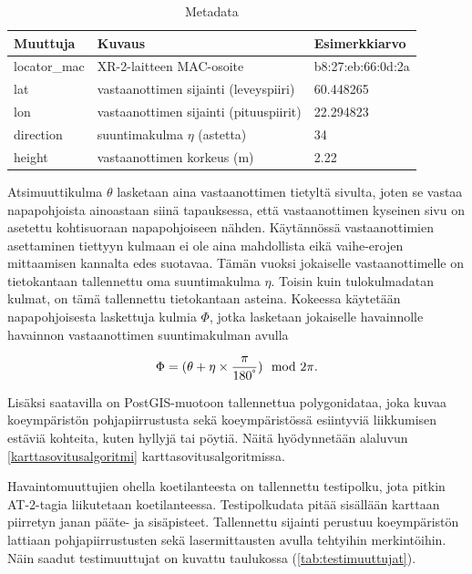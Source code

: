 \documentclass[
  12pt,
  a4paper, twoside]{book}
\begin{document}
\def\arraystretch{1.25} 
\begin{table}[H]
\centering
\begin{tabular}{|l|l|l|}
\hline
Muuttuja & Kuvaus & Esimerkkiarvo\\
\hline
locator\_mac & XR-2-laitteen MAC-osoite & b8:27:eb:66:0d:2a\\
lat & vastaanottimen sijainti (leveyspiiri) & 60.448265\\
lon & vastaanottimen sijainti (pituuspiirit) & 22.294823\\
direction & suuntimakulma $\eta$ (astetta) & 34\\
height & vastaanottimen korkeus (m) & 2.22 \\
\hline
\end{tabular}
\caption{Metadata}
\label{tab:metadata}
\end{table}

Atsimuuttikulma \(\theta\) lasketaan aina vastaanottimen tietyltä sivulta, joten se vastaa napapohjoista ainoastaan siinä tapauksessa, että vastaanottimen kyseinen sivu on asetettu kohtisuoraan napapohjoiseen nähden. Käytännössä vastaanottimien asettaminen tiettyyn kulmaan ei ole aina mahdollista eikä vaihe-erojen mittaamisen kannalta edes suotavaa. Tämän vuoksi jokaiselle vastaanottimelle on tietokantaan tallennettu oma suuntimakulma \(\eta\). Toisin kuin tulokulmadatan kulmat, on tämä tallennettu tietokantaan asteina. Kokeessa käytetään napapohjoisesta laskettuja kulmia \(\Phi\), jotka lasketaan jokaiselle havainnolle havainnon vastaanottimen suuntimakulman avulla

\begin{align}
\Phi=(\theta + \eta \times \frac{\pi}{180^\degree}) \mod 2 \pi.
\end{align}

Lisäksi saatavilla on PostGIS-muotoon tallennettua polygonidataa, joka kuvaa koeympäristön pohjapiirrustusta sekä koeympäristössä esiintyviä liikkumisen estäviä kohteita, kuten hyllyjä tai pöytiä. Näitä hyödynnetään alaluvun \ref{karttasovitusalgoritmi} karttasovitusalgoritmissa.

Havaintomuuttujien ohella koetilanteesta on tallennettu testipolku, jota pitkin AT-2-tagia liikutetaan koetilanteessa. Testipolkudata pitää sisällään karttaan piirretyn janan pääte- ja sisäpisteet. Tallennettu sijainti perustuu koeympäristön lattiaan pohjapiirrustusten sekä lasermittausten avulla tehtyihin merkintöihin. Näin saadut testimuuttujat on kuvattu taulukossa (\ref{tab:testimuuttujat}).
\end{document}
